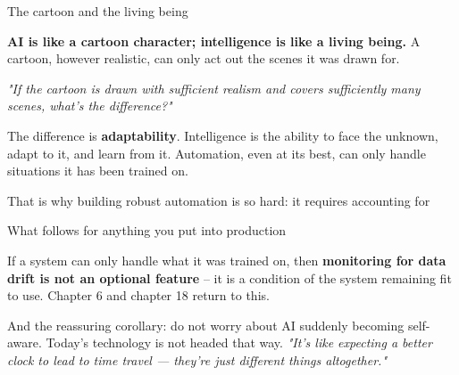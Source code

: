 \documentclass[aspectratio=169,11pt,t]{beamer}
\begin{document}
\begin{frame}[shrink=25]{The cartoon and the living being}
\begin{minipage}[t]{0.485\textwidth}
{\fontsize{9.4}{12.6}\selectfont\color{fg2}\textbf{AI is like a cartoon character; intelligence is like a living being.} A cartoon, however realistic, can only act out the scenes it was drawn for.\par}\vskip 4pt
{\fontsize{9.4}{12.6}\selectfont\color{fg2}\textit{"If the cartoon is drawn with sufficient realism and covers sufficiently many scenes, what's the difference?"}\par}\vskip 4pt

\end{minipage}%
\hfill
\begin{minipage}[t]{0.485\textwidth}
\begin{iband}[rose]
The difference is \textbf{adaptability}. Intelligence is the ability to face the unknown, adapt to it, and learn from it. Automation, even at its best, can only handle situations it has been trained on.
\end{iband}

\end{minipage}%
{\fontsize{9.4}{12.6}\selectfont\color{fg2}That is why building robust automation is so hard: it requires accounting for \par}\vskip 4pt
\end{frame}

\begin{frame}[shrink=25]{What follows for anything you put into production}
\begin{iband}[rose]
If a system can only handle what it was trained on, then \textbf{monitoring for data drift is not an optional feature} -- it is a condition of the system remaining fit to use. Chapter 6 and chapter 18 return to this.
\end{iband}
{\fontsize{9.4}{12.6}\selectfont\color{fg2}And the reassuring corollary: do not worry about AI suddenly becoming self-aware. Today's technology is not headed that way. \textit{"It's like expecting a better clock to lead to time travel --- they're just different things altogether."}\par}\vskip 4pt
\end{frame}

\end{document}
